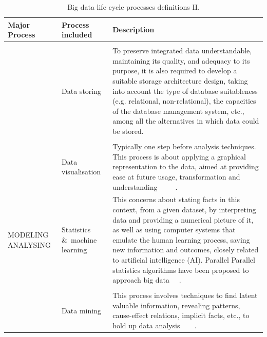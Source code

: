 \begin{table}[H]
    \caption{Big data life cycle processes definitions II.}
    \label{table:big_data_life_cyle_processes_definition_II}
    \centering
    \begin{tabular}{p{4.0cm} p{3.1cm} p{7cm}}
    \toprule
    \textbf{Major Process} & \textbf{Process included} & \textbf{Description} \\ 
    \bottomrule   
    & \\ &  Data storing & To preserve integrated data understandable, maintaining its quality, and
    adequacy to its purpose, it is also required to develop a suitable storage
    architecture design, taking into account the type of database suitableness (e.g. relational, non-relational),
    the capacities of the database management system, etc., among all the alternatives in which data could be stored. ~\cite{ComputingResearchAssociation}
    \\
    & \\ & Data visualisation & Typically one step before analysis
    techniques. This process is about applying a graphical representation to
    the data, aimed at providing ease at future usage, transformation and understanding ~\cite{Fayyad2002} ~\cite{Ware2012} ~\cite{Philip2014}.
    \\ 
    MODELING ANALYSING & Statistics \&\ machine learning & This concerns about stating facts in
    this context, from a given dataset, by interpreting data and providing a numerical picture of it, as well as using computer systems that emulate the human learning process, saving new information and outcomes,
    closely related to artificial intelligence (AI). Parallel Parallel statistics algorithms have been proposed to approach big data ~\cite{Ryszard2013}~\cite{PhilipChen2014}.
    \\
    & \\ & Data mining & This process involves techniques to
    find latent valuable information, revealing patterns, cause-effect relations, implicit facts, etc., to hold up
    data analysis ~\cite{Chandrasekar2001} ~\cite{Philip2014} .
    \\
    \bottomrule
\end{tabular}
\end{table}

